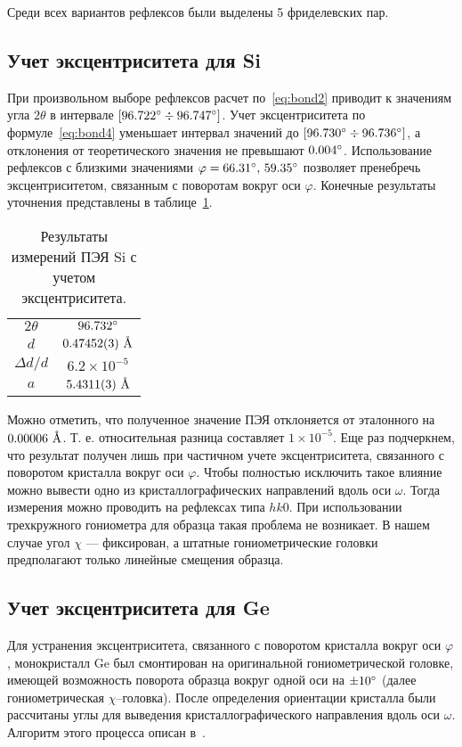 Среди всех вариантов рефлексов были выделены 5 фриделевских пар.
\subsection{Учет эксцентриситета для Si}
При произвольном выборе рефлексов расчет по~\ref{eq:bond2} приводит к значениям угла $2\theta$ в интервале $[96.722^\circ\div96.747^\circ]$.
Учет эксцентриситета по формуле~\ref{eq:bond4} уменьшает интервал значений до $[96.730^\circ\div96.736^\circ]$, а отклонения от теоретического значения не превышают $0.004^\circ$.
Использование рефлексов с близкими значениями $\varphi = 66.31^\circ, \, 59.35^\circ$ позволяет пренебречь эксцентриситетом, связанным с поворотам вокруг оси $\varphi$.
Конечные результаты уточнения представлены в таблице~\ref{tab:Si:eccentr}.
\begin{table}[ht!]
    \centering
    \begin{tabular}{ |c|c| }
        \hline
        $2\theta$ & $96.732^\circ$ \\
        $d$ & $0.47452 (3)\ \text{\AA}$ \\
        $\Delta d / d$ & $6.2 \times 10^{-5}$ \\
        $a$ & $5.4311 (3)\ \text{\AA}$ \\
        \hline
    \end{tabular}
    \caption{Результаты измерений ПЭЯ Si с учетом эксцентриситета.}
    \label{tab:Si:eccentr}
\end{table}

Можно отметить, что полученное значение ПЭЯ отклоняется от эталонного на $0.00006\ \text{\AA}$.
Т. е. относительная разница составляет $1\times 10^{-5}$.
Еще раз подчеркнем, что результат получен лишь при частичном учете эксцентриситета, связанного с поворотом кристалла вокруг оси $\varphi$.
Чтобы полностью исключить такое влияние можно вывести одно из кристаллографических направлений вдоль оси $\omega$.
Тогда измерения можно проводить на рефлексах типа $hk0$.
При использовании трехкружного гониометра для образца такая проблема не возникает.
В нашем случае угол $\chi$ --- фиксирован, а штатные гониометрические головки предполагают только линейные смещения образца.
\subsection{Учет эксцентриситета для Ge}
Для устранения эксцентриситета, связанного с поворотом кристалла вокруг оси $\varphi$, монокристалл Ge был смонтирован на оригинальной гониометрической головке, имеющей возможность поворота образца вокруг одной оси на $\pm 10^\circ$ (далее гониометрическая $\chi$--головка).
После определения ориентации кристалла были рассчитаны углы для выведения кристаллографического направления вдоль оси $\omega$. Алгоритм этого процесса описан в~\cite{Kudryavtsev:2024:eccentr}.

